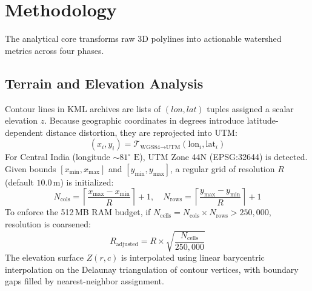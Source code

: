 \documentclass[manuscript,screen,review]{acmart}
\begin{document}
\section{Methodology}
\label{sec:methodology}
The analytical core transforms raw 3D polylines into actionable watershed metrics across four phases.

\subsection{Terrain and Elevation Analysis}
Contour lines in KML archives are lists of $(lon, lat)$ tuples assigned a scalar elevation $z$. Because geographic coordinates in degrees introduce latitude-dependent distance distortion, they are reprojected into UTM:
\begin{equation}
    (x_i, y_i) = \mathcal{T}_{\text{WGS84}\rightarrow\text{UTM}}(\text{lon}_i, \text{lat}_i)
\end{equation}
For Central India (longitude $\sim 81^\circ\text{ E}$), UTM Zone 44N (EPSG:32644) is detected. Given bounds $[x_{\min}, x_{\max}]$ and $[y_{\min}, y_{\max}]$, a regular grid of resolution $R$ (default $10.0\,\text{m}$) is initialized:
\begin{equation}
    N_{\text{cols}} = \left\lceil \frac{x_{\max} - x_{\min}}{R} \right\rceil + 1, \quad
    N_{\text{rows}} = \left\lceil \frac{y_{\max} - y_{\min}}{R} \right\rceil + 1
\end{equation}
To enforce the 512\,MB RAM budget, if $N_{\text{cells}} = N_{\text{cols}} \times N_{\text{rows}} > 250,000$, resolution is coarsened:
\begin{equation}
    R_{\text{adjusted}} = R \times \sqrt{\frac{N_{\text{cells}}}{250,000}}
\end{equation}
The elevation surface $Z(r, c)$ is interpolated using linear barycentric interpolation on the Delaunay triangulation of contour vertices, with boundary gaps filled by nearest-neighbor assignment.
\end{document}

